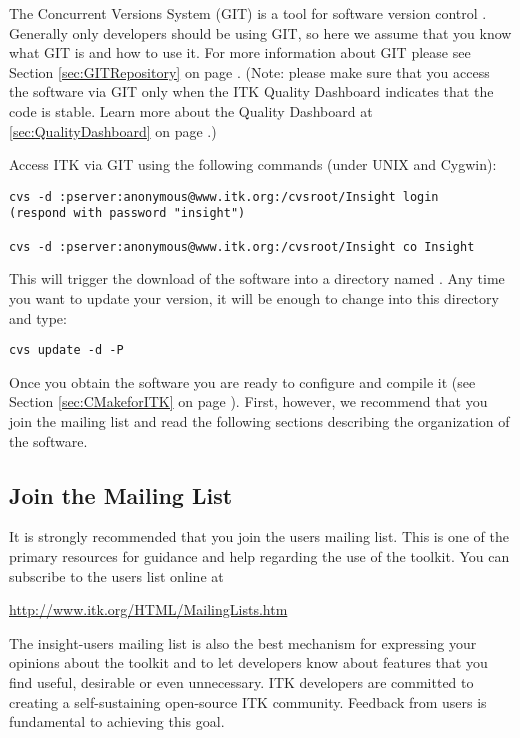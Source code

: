 
The Concurrent Versions System (GIT) is a tool for software version control
\cite{Fogel1999}. Generally only developers should be using GIT, so here we 
assume that you know what GIT is and how to use it.  For more information
about GIT please see Section \ref{sec:GITRepository} on page 
\pageref{sec:GITRepository}. (Note: please make sure that you access the 
software via GIT only when the ITK Quality Dashboard indicates that the 
code is stable. Learn more about the Quality Dashboard at
\ref{sec:QualityDashboard} on page \pageref{sec:QualityDashboard}.)

Access ITK via GIT using the following commands (under UNIX and Cygwin): 
\begin{verbatim}
cvs -d :pserver:anonymous@www.itk.org:/cvsroot/Insight login
(respond with password "insight")

cvs -d :pserver:anonymous@www.itk.org:/cvsroot/Insight co Insight
\end{verbatim}

This will trigger the download of the software into a directory named
.  Any time you want to update your version, it will be enough to
change into this directory  and type:
\begin{verbatim}
cvs update -d -P
\end{verbatim}

Once you obtain the software you are ready to configure and compile it (see
Section \ref{sec:CMakeforITK} on page \pageref{sec:CMakeforITK}). First,
however, we recommend that you join the mailing list and read the following
sections describing the organization of the software. 

\subsection{Join the Mailing List}
\label{sec:JoinMailList}


It is strongly recommended that you join the users mailing list. This is one
of the primary resources for guidance and help regarding the use of the 
toolkit. You can subscribe to the users list online at

\begin{center}
\url{http://www.itk.org/HTML/MailingLists.htm}
\end{center} 

The insight-users mailing list is also the best mechanism for expressing your
opinions about the toolkit and to let developers know about features that you
find useful, desirable or even unnecessary. ITK developers are committed to
creating a self-sustaining open-source ITK community. Feedback from users is
fundamental to achieving this goal.

